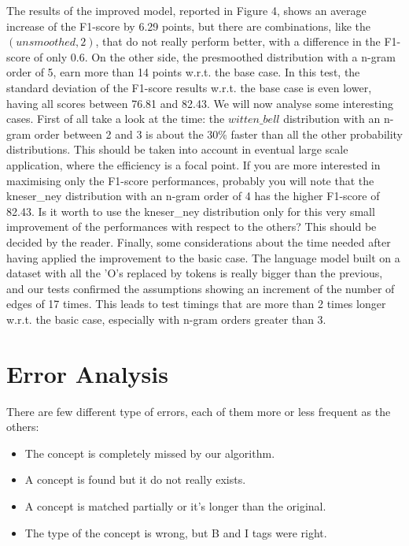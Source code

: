 \documentclass[11pt,a4paper]{article}
\begin{document}
The results of the improved model, reported in Figure 4, shows an average increase of the F1-score by 6.29 points, but there are combinations, like the $(unsmoothed,2)$, that do not really perform better, with a difference in the F1-score of only 0.6. On the other side, the presmoothed distribution with a n-gram order of 5, earn more than 14 points w.r.t. the base case. In this test, the standard deviation of the F1-score results w.r.t. the base case is even lower, having all scores between 76.81 and 82.43. We will now analyse some interesting cases. First of all take a look at the time: the $witten\_bell$ distribution with an n-gram order between 2 and 3 is about the 30\% faster than all the other probability distributions. This should be taken into account in eventual large scale application, where the efficiency is a focal point. If you are more interested in maximising only the F1-score performances, probably you will note that the kneser\_ney distribution with an n-gram order of 4 has the higher F1-score of 82.43. Is it worth to use the kneser\_ney distribution only for this very small improvement of the performances with respect to the others? This should be decided by the reader.
Finally, some considerations about the time needed after having applied the improvement to the basic case. The language model built on a dataset with all the 'O's replaced by tokens is really bigger than the previous, and our tests confirmed the assumptions showing an increment of the number of edges of 17 times. This leads to test timings that are more than 2 times longer w.r.t. the basic case, especially with n-gram orders greater than 3.

\section{Error Analysis}

There are few different type of errors, each of them more or less frequent as the others:
\begin{itemize}
\item The concept is completely missed by our algorithm.
\item A concept is found but it do not really exists.
\item A concept is matched partially or it's longer than the original.
\item The type of the concept is wrong, but B and I tags were right.
\end{itemize}
\end{document}
